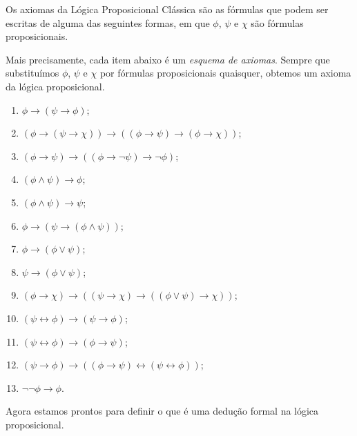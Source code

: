 \begin{metadefinition}\label{mdef:axiomasLogicaProposicional}
    Os axiomas da Lógica Proposicional Clássica são as fórmulas que podem ser escritas de alguma das seguintes formas, em que $\phi$, $\psi$ e $\chi$ são fórmulas proposicionais.

    Mais precisamente, cada item abaixo é um \emph{esquema de axiomas}.
    Sempre que substituímos $\phi$, $\psi$ e $\chi$ por fórmulas proposicionais quaisquer, obtemos um axioma da lógica proposicional.

    \begin{enumerate}[label=(PC\arabic*), leftmargin=3.2em]
        \item $\phi \rightarrow (\psi \rightarrow \phi)$;
        \item $(\phi \rightarrow (\psi \rightarrow \chi)) \rightarrow ((\phi \rightarrow \psi) \rightarrow (\phi \rightarrow \chi))$;
        \item $(\phi \rightarrow \psi) \rightarrow ((\phi \rightarrow \neg \psi) \rightarrow \neg \phi)$;
        \item $(\phi \land \psi) \rightarrow \phi$;
        \item $(\phi \land \psi) \rightarrow \psi$;
        \item $\phi \rightarrow (\psi \rightarrow (\phi \land \psi))$;
        \item $\phi \rightarrow (\phi \lor \psi)$;
        \item $\psi \rightarrow (\phi \lor \psi)$;
        \item $(\phi \rightarrow \chi) \rightarrow ((\psi \rightarrow \chi) \rightarrow ((\phi \lor \psi) \rightarrow \chi))$;
        \item $(\psi \leftrightarrow \phi) \rightarrow (\psi \rightarrow \phi)$;
        \item $(\psi \leftrightarrow \phi) \rightarrow (\phi \rightarrow \psi)$;
        \item $(\psi \rightarrow \phi) \rightarrow ((\phi \rightarrow \psi) \leftrightarrow (\psi \leftrightarrow \phi))$;
        \item $\neg \neg \phi \rightarrow \phi$.
    \end{enumerate}
\end{metadefinition}


Agora estamos prontos para definir o que é uma dedução formal na lógica proposicional.

